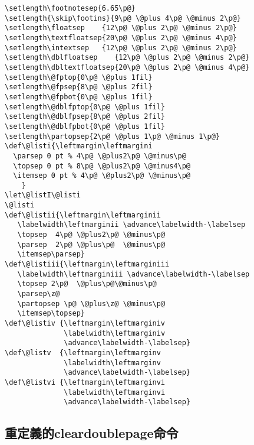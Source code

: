 \begin{lstlisting}[firstnumber=233]
\setlength\footnotesep{6.65\p@}
\setlength{\skip\footins}{9\p@ \@plus 4\p@ \@minus 2\p@}
\setlength\floatsep    {12\p@ \@plus 2\p@ \@minus 2\p@}
\setlength\textfloatsep{20\p@ \@plus 2\p@ \@minus 4\p@}
\setlength\intextsep   {12\p@ \@plus 2\p@ \@minus 2\p@}
\setlength\dblfloatsep    {12\p@ \@plus 2\p@ \@minus 2\p@}
\setlength\dbltextfloatsep{20\p@ \@plus 2\p@ \@minus 4\p@}
\setlength\@fptop{0\p@ \@plus 1fil}
\setlength\@fpsep{8\p@ \@plus 2fil}
\setlength\@fpbot{0\p@ \@plus 1fil}
\setlength\@dblfptop{0\p@ \@plus 1fil}
\setlength\@dblfpsep{8\p@ \@plus 2fil}
\setlength\@dblfpbot{0\p@ \@plus 1fil}
\setlength\partopsep{2\p@ \@plus 1\p@ \@minus 1\p@}
\def\@listi{\leftmargin\leftmargini
  \parsep 0 pt % 4\p@ \@plus2\p@ \@minus\p@
  \topsep 0 pt % 8\p@ \@plus2\p@ \@minus4\p@
  \itemsep 0 pt % 4\p@ \@plus2\p@ \@minus\p@
  	}
\let\@listI\@listi
\@listi
\def\@listii{\leftmargin\leftmarginii
   \labelwidth\leftmarginii \advance\labelwidth-\labelsep
   \topsep  4\p@ \@plus2\p@ \@minus\p@
   \parsep  2\p@ \@plus\p@  \@minus\p@
   \itemsep\parsep}
\def\@listiii{\leftmargin\leftmarginiii
   \labelwidth\leftmarginiii \advance\labelwidth-\labelsep
   \topsep 2\p@  \@plus\p@\@minus\p@
   \parsep\z@
   \partopsep \p@ \@plus\z@ \@minus\p@
   \itemsep\topsep}
\def\@listiv {\leftmargin\leftmarginiv
              \labelwidth\leftmarginiv
              \advance\labelwidth-\labelsep}
\def\@listv  {\leftmargin\leftmarginv
              \labelwidth\leftmarginv
              \advance\labelwidth-\labelsep}
\def\@listvi {\leftmargin\leftmarginvi
              \labelwidth\leftmarginvi
              \advance\labelwidth-\labelsep}
\end{lstlisting}

\subsection{重定義的cleardoublepage命令}


